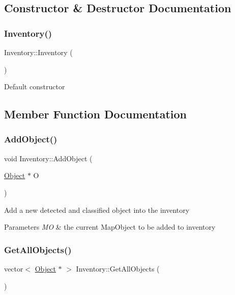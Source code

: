 \subsection{Constructor \& Destructor Documentation}
\mbox{\label{classInventory_a10485613fc8bfb32ee564d9b5110f8fb}} 
\subsubsection{\texorpdfstring{Inventory()}{Inventory()}}
{\footnotesize\ttfamily Inventory\+::\+Inventory (\begin{DoxyParamCaption}{ }\end{DoxyParamCaption})}

Default constructor 

\subsection{Member Function Documentation}
\mbox{\label{classInventory_a3622ba6ef9cd884344c055bea63aa02f}} 
\subsubsection{\texorpdfstring{Add\+Object()}{AddObject()}}
{\footnotesize\ttfamily void Inventory\+::\+Add\+Object (\begin{DoxyParamCaption}\item[{\hyperlink{classObject}{Object} $\ast$}]{O }\end{DoxyParamCaption})}

Add a new detected and classified object into the inventory 
\begin{DoxyParams}{Parameters}
{\em MO} & the current Map\+Object to be added to inventory \\
\hline
\end{DoxyParams}
\mbox{\label{classInventory_a239cc8d4e9716eed4193c06421e483c2}} 
\subsubsection{\texorpdfstring{Get\+All\+Objects()}{GetAllObjects()}}
{\footnotesize\ttfamily vector$<$ \hyperlink{classObject}{Object} $\ast$ $>$ Inventory\+::\+Get\+All\+Objects (\begin{DoxyParamCaption}{ }\end{DoxyParamCaption})}

